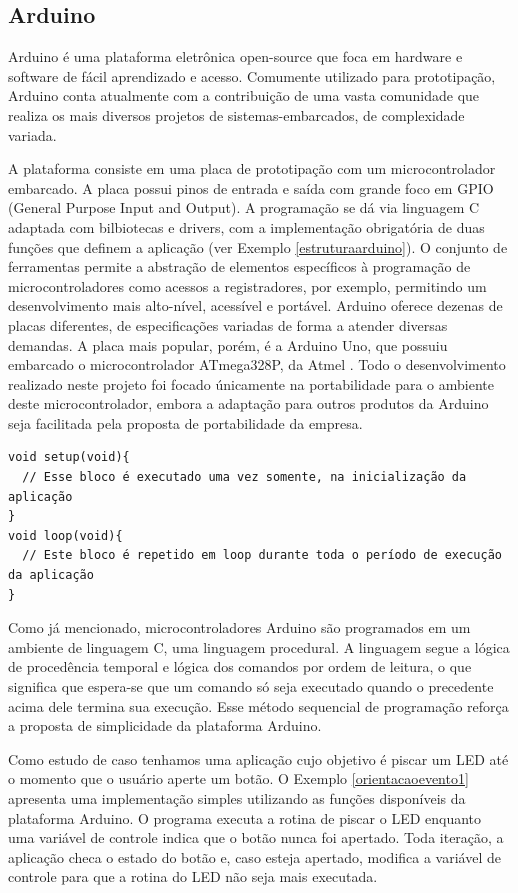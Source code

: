 \documentclass[11pt]{article}
\begin{document}
\subsection{Arduino}
\tab Arduino é uma plataforma eletrônica open-source que foca em hardware e software de fácil aprendizado e acesso. Comumente utilizado para prototipação, Arduino conta atualmente com a contribuição de uma vasta comunidade que realiza os mais diversos projetos de sistemas-embarcados, de complexidade variada. \cite{arduinoblog}
\par A plataforma consiste em uma placa de prototipação com um microcontrolador embarcado. A placa possui pinos de entrada e saída com grande foco em GPIO (General Purpose Input and Output). A programação se dá via linguagem C adaptada com bilbiotecas e drivers, com a implementação obrigatória de duas funções que definem a aplicação (ver Exemplo \ref{estruturaarduino}). O conjunto de ferramentas permite a abstração de elementos específicos à programação de microcontroladores como acessos a registradores, por exemplo, permitindo um desenvolvimento mais alto-nível, acessível e portável. Arduino oferece dezenas de placas diferentes, de especificações variadas de forma a atender diversas demandas. A placa mais popular, porém, é a Arduino Uno, que possuiu embarcado o microcontrolador ATmega328P, da Atmel \cite{atmegadatasheet}. Todo o desenvolvimento realizado neste projeto foi focado únicamente na portabilidade para o ambiente deste microcontrolador, embora a adaptação para outros produtos da Arduino seja facilitada pela proposta de portabilidade da empresa.
\begin{lstlisting}[style=CStyle,label=estruturaarduino,caption=Estrutura de uma aplicação Arduino]
void setup(void){
  // Esse bloco é executado uma vez somente, na inicialização da aplicação
}
void loop(void){
  // Este bloco é repetido em loop durante toda o período de execução da aplicação
}
\end{lstlisting}
\par Como já mencionado, microcontroladores Arduino são programados em um ambiente de linguagem C, uma linguagem procedural. A linguagem segue a lógica de procedência temporal e lógica dos comandos por ordem de leitura, o que significa que espera-se que um comando só seja executado quando o precedente acima dele termina sua execução. Esse método sequencial de programação reforça a proposta de simplicidade da plataforma Arduino. 
\par Como estudo de caso tenhamos uma aplicação cujo objetivo é piscar um LED até o momento que o usuário aperte um botão. O Exemplo \ref{orientacaoevento1} apresenta uma implementação simples utilizando as funções disponíveis da plataforma Arduino. O programa executa a rotina de piscar o LED enquanto uma variável de controle indica que o botão nunca foi apertado. Toda iteração, a aplicação checa o estado do botão e, caso esteja apertado, modifica a variável de controle para que a rotina do LED não seja mais executada.
\end{document}
